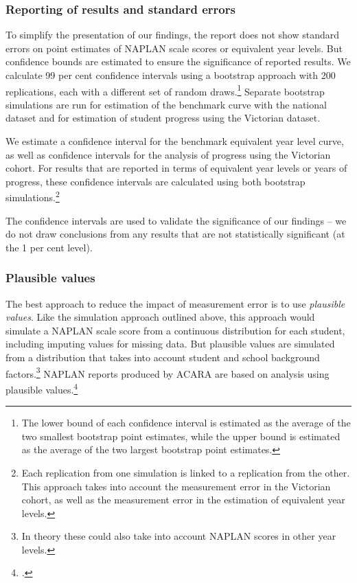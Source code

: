 \subsubsection*{Reporting of results and standard errors}

To simplify the presentation of our findings, the report does not show standard errors on point estimates of NAPLAN scale scores or equivalent year levels. But confidence bounds are estimated to ensure the significance of reported results. We calculate 99 per cent confidence intervals using a bootstrap approach with 200 replications, each with a different set of random draws.\footnote{The lower bound of each confidence interval is estimated as the average of the two smallest bootstrap point estimates, while the upper bound is estimated as the average of the two largest bootstrap point estimates.} Separate bootstrap simulations are run for estimation of the benchmark curve with the national dataset and for estimation of student progress using the Victorian dataset.

We estimate a confidence interval for the benchmark equivalent year level curve, as well as confidence intervals for the analysis of progress using the Victorian cohort. For results that are reported in terms of equivalent year levels or years of progress, these confidence intervals are calculated using both bootstrap simulations.\footnote{Each replication from one simulation is linked to a replication from the other. This approach takes into account the measurement error in the Victorian cohort, as well as the measurement error in the estimation of equivalent year levels.} 

The confidence intervals are used to validate the significance of our findings -- we do not draw conclusions from any results that are not statistically significant (at the 1 per cent level).

\subsubsection*{Plausible values}

The best approach to reduce the impact of measurement error is to use \textit{plausible values}. Like the simulation approach outlined above, this approach would simulate a NAPLAN scale score from a continuous distribution for each student, including imputing values for missing data. But plausible values are simulated from a distribution that takes into account student and school background factors.\footnote{In theory these could also take into account NAPLAN scores in other year levels.} NAPLAN reports produced by ACARA are based on analysis using plausible values.\footcite[][22]{acara2015a}

